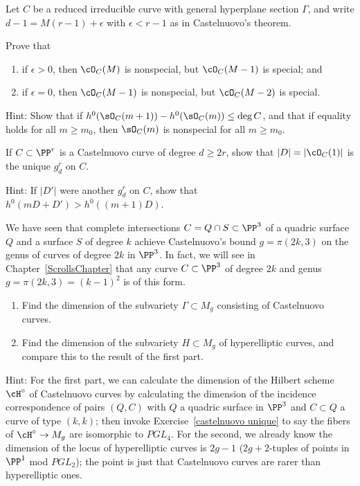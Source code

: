 \begin{exercise}
Let $C$ be a reduced irreducible curve with general hyperplane section $\Gamma$,
and write 
$d-1 = M(r-1) +\epsilon$ with $\epsilon<r-1$ as in Castelnuovo's theorem.
 
Prove that
\begin{enumerate}
\item if $\epsilon > 0$, then $\cO_C(M)$ is nonspecial, but $\cO_C(M-1)$ is special; and
\item if $\epsilon = 0$, then $\cO_C(M-1)$ is nonspecial, but $\cO_C(M-2)$ is special.
\end{enumerate}

Hint: Show that if $h^{0}(\sO_{C}(m+1))-h^{0}(\sO_{C}(m)) \leq \deg C$, and that if equality holds for
all $m\geq m_{0}$, then $\sO_{C}(m) $ is nonspecial for all $m\geq m_{0}$.
\end{exercise}

\begin{exercise}\label{castelnuovo unique}
If $C \subset \PP^r$ is a Castelnuovo curve of degree $d \geq 2r$, show that $|D| = |\cO_C(1)|$ is the unique $g^r_d$ on $C$.

Hint: If $|D'|$ were another $g^r_d$ on $C$, show that $h^0(mD + D') > h^0((m+1)D)$.
\end{exercise}


\begin{exercise}\label{rarity of Castelnuovo}
We have seen that complete intersections $C = Q \cap S \subset \PP^3$ of a quadric surface $Q$ and a surface $S$ of degree $k$ achieve Castelnuovo's bound $g = \pi(2k, 3)$ on the genus of curves of degree $2k$ in $\PP^3$. In fact, we will see in Chapter~\ref{ScrollsChapter} that any curve $C \subset \PP^3$ of degree $2k$ and genus $g = \pi(2k, 3) = (k-1)^2$ is of this form.
\begin{enumerate}
\item Find the dimension of the subvariety $\Gamma \subset M_g$ consisting of Castelnuovo curves.
\item Find the dimension of the subvariety $H \subset M_g$ of hyperelliptic curves, and compare this to the result of the first part.
\end{enumerate}

Hint: For the first part, we can calculate the dimension of the Hilbert scheme $\cH^\circ$ of Castelnuovo curves by calculating the dimension of the incidence correspondence of pairs $(Q, C)$ with $Q$ a quadric surface in $\PP^3$ and $C \subset Q$ a curve of type $(k,k)$; then invoke Exercise~\ref{castelnuovo unique} to say the fibers of $\cH^\circ \to M_g$ are isomorphic to $PGL_4$. For the second, we already know the dimension of the locus of hyperelliptic curves is $2g-1$ ($2g+2$-tuples of points in $\PP^1$ mod $PGL_2$); the point is just that Castelnuovo curves are rarer than hyperelliptic ones.
\end{exercise}





